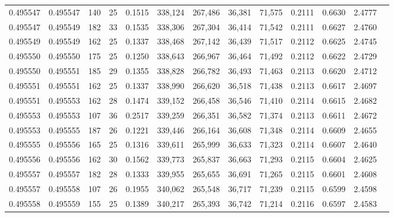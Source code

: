 \begin{tabular}{rrrrrrrrrrrrr}
0.495547 & 0.495547 & 140 &  25 &                                     0.1515 & 338,124 & 267,486 &  36,381 &  71,575 & 0.2111 & 0.6630 & 2.4777 \\
0.495547 & 0.495549 & 182 &  33 &                                     0.1535 & 338,306 & 267,304 &  36,414 &  71,542 & 0.2111 & 0.6627 & 2.4760 \\
0.495549 & 0.495549 & 162 &  25 &                                     0.1337 & 338,468 & 267,142 &  36,439 &  71,517 & 0.2112 & 0.6625 & 2.4745 \\
0.495550 & 0.495550 & 175 &  25 &                                     0.1250 & 338,643 & 266,967 &  36,464 &  71,492 & 0.2112 & 0.6622 & 2.4729 \\
0.495550 & 0.495551 & 185 &  29 &                                     0.1355 & 338,828 & 266,782 &  36,493 &  71,463 & 0.2113 & 0.6620 & 2.4712 \\
0.495551 & 0.495551 & 162 &  25 &                                     0.1337 & 338,990 & 266,620 &  36,518 &  71,438 & 0.2113 & 0.6617 & 2.4697 \\
0.495551 & 0.495553 & 162 &  28 &                                     0.1474 & 339,152 & 266,458 &  36,546 &  71,410 & 0.2114 & 0.6615 & 2.4682 \\
0.495553 & 0.495553 & 107 &  36 &                                     0.2517 & 339,259 & 266,351 &  36,582 &  71,374 & 0.2113 & 0.6611 & 2.4672 \\
0.495553 & 0.495555 & 187 &  26 &                                     0.1221 & 339,446 & 266,164 &  36,608 &  71,348 & 0.2114 & 0.6609 & 2.4655 \\
0.495555 & 0.495556 & 165 &  25 &                                     0.1316 & 339,611 & 265,999 &  36,633 &  71,323 & 0.2114 & 0.6607 & 2.4640 \\
0.495556 & 0.495556 & 162 &  30 &                                     0.1562 & 339,773 & 265,837 &  36,663 &  71,293 & 0.2115 & 0.6604 & 2.4625 \\
0.495557 & 0.495557 & 182 &  28 &                                     0.1333 & 339,955 & 265,655 &  36,691 &  71,265 & 0.2115 & 0.6601 & 2.4608 \\
0.495557 & 0.495558 & 107 &  26 &                                     0.1955 & 340,062 & 265,548 &  36,717 &  71,239 & 0.2115 & 0.6599 & 2.4598 \\
0.495558 & 0.495559 & 155 &  25 &                                     0.1389 & 340,217 & 265,393 &  36,742 &  71,214 & 0.2116 & 0.6597 & 2.4583 \\

\end{tabular}
